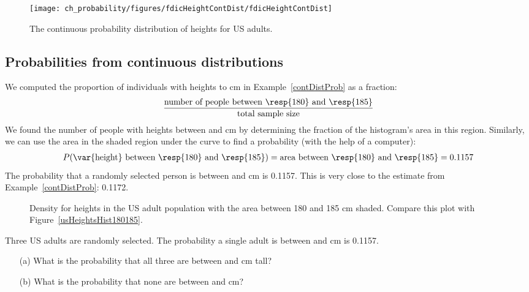 \begin{figure}[tbh]
\centering
\texttt{[image: ch\_probability/figures/fdicHeightContDist/fdicHeightContDist]}
\caption{The continuous probability distribution of heights for US adults.}
\label{fdicHeightContDist}
\end{figure}



\D{\newpage}

\subsection{Probabilities from continuous distributions}

We computed the proportion of individuals with heights  to  cm in Example~\ref{contDistProb} as a fraction:
\begin{align*}
\frac{\text{number of people between \resp{180} and \resp{185}}}{\text{total sample size}}
\end{align*}
We found the number of people with heights between  and  cm by determining the fraction of the histogram's area in this region. Similarly, we can use the area in the shaded region under the curve to find a probability (with the help of a computer):
\begin{align*}
P(\text{\var{height} between \resp{180} and \resp{185}})
	= \text{area between \resp{180} and \resp{185}}
	= 0.1157
\end{align*}
The probability that a randomly selected person is between  and  cm is 0.1157. This is very close to the estimate from Example~\ref{contDistProb}: 0.1172. 

\begin{figure}[h]
  \centering
  \caption{Density for heights in the US adult population
      with the area between 180 and 185 cm shaded.
      Compare this plot with Figure~\ref{usHeightsHist180185}.}
  \label{fdicHeightContDistFilled}
\end{figure}

\begin{exercisewrap}
\begin{nexercise}
Three US adults are randomly selected. The probability a single adult is between  and  cm is 0.1157.\footnotemark\vspace{-1.5mm}
\begin{enumerate}
\setlength{\itemsep}{0mm}
\item[(a)] What is the probability that all three are between  and  cm tall?
\item[(b)] What is the probability that none are between  and  cm?
\end{enumerate}
\end{nexercise}
\end{exercisewrap}

